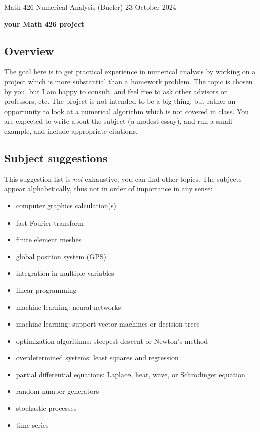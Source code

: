 \documentclass[11pt]{amsart}
\begin{document}
\scriptsize \noindent Math 426 Numerical Analysis (Bueler) \hfill 23 October 2024
\bigskip

\Large\centerline{\textbf{your Math 426 project}}
\normalsize

\thispagestyle{empty}

\bigskip

\subsection*{Overview}  The goal here is to get practical experience in numerical analysis by working on a project which is more substantial than a homework problem.  The topic is chosen by you, but I am happy to consult, and feel free to ask other advisors or professors, etc.  The project is not intended to be a big thing, but rather an opportunity to look at a numerical algorithm which is not covered in class.  You are expected to write about the subject (a modest essay), and run a small example, and include appropriate citations.

\subsection*{Subject suggestions}  This suggestion list is \emph{not} exhaustive; you can find other topics.  The subjects appear alphabetically, thus not in order of importance in any sense:
\begin{itemize}
\item computer graphics calculation(s)
\item fast Fourier transform
\item finite element meshes
\item global position system (GPS)
\item integration in multiple variables
\item linear programming
\item machine learning: neural networks
\item machine learning: support vector machines or decision trees
\item optimization algorithms: steepest descent or Newton's method
\item overdetermined systems: least squares and regression
\item partial differential equations: Laplace, heat, wave, or Schr\"odinger equation
\item random number generators
\item stochastic processes
\item time series
\end{itemize}
\end{document}
